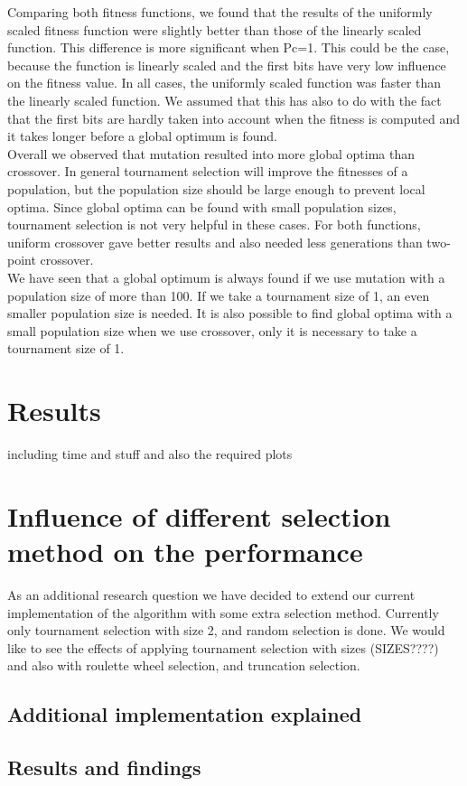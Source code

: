 \documentclass[10pt,a4paper,onecolumn]{article}
\begin{document}
Comparing both fitness functions, we found that the results of the uniformly scaled fitness function were slightly better than those of the linearly scaled function.
This difference is more significant when Pc=1.
This could be the case, because the function is linearly scaled and the first bits have very low influence on the fitness value.
In all cases, the uniformly scaled function was faster than the linearly scaled function.
We assumed that this has also to do with the fact that the first bits are hardly taken into account when the fitness is computed and it takes longer before a global optimum is found. \\

Overall we observed that mutation resulted into more global optima than crossover.
In general tournament selection will improve the fitnesses of a population, but the population size should be large enough to prevent local optima.
Since global optima can be found with small population sizes, tournament selection is not very helpful in these cases.
For both functions, uniform crossover gave better results and also needed less generations than two-point crossover. \\

We have seen that a global optimum is always found if we use mutation with a population size of more than 100. If we take a tournament size of 1, an even smaller population size is needed.
It is also possible to find global optima with a small population size when we use crossover, only it is necessary to take a tournament size of 1.


\section{Results} \label{sec:results}
including time and stuff
and also the required plots

\section{Influence of different selection method on the performance}
\label{sec:research}
As an additional research question we have decided to extend our current implementation of the algorithm with some extra selection method. Currently only tournament selection with size 2, and random selection is done. We would like to see the effects of applying tournament selection with sizes (SIZES????) and also with roulette wheel selection, and truncation selection.

\subsection{Additional implementation explained}

\subsection{Results and findings}
\end{document}
